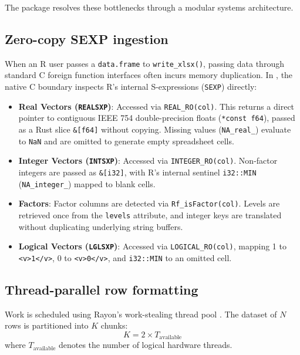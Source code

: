 The  package resolves these bottlenecks through a modular systems architecture.

\subsection{Zero-copy SEXP ingestion}\label{zero-copy-sexp-ingestion}

When an R user passes a \texttt{data.frame} to \texttt{write\_xlsx()}, passing data through standard C foreign function interfaces often incurs memory duplication. In , the native C boundary inspects R's internal S-expressions (\texttt{SEXP}) directly:

\begin{itemize}
\tightlist
\item
  \textbf{Real Vectors (\texttt{REALSXP})}: Accessed via \texttt{REAL\_RO(col)}. This returns a direct pointer to contiguous IEEE 754 double-precision floats (\texttt{*const\ f64}), passed as a Rust slice \texttt{\&{[}f64{]}} without copying. Missing values (\texttt{NA\_real\_}) evaluate to \texttt{NaN} and are omitted to generate empty spreadsheet cells.
\item
  \textbf{Integer Vectors (\texttt{INTSXP})}: Accessed via \texttt{INTEGER\_RO(col)}. Non-factor integers are passed as \texttt{\&{[}i32{]}}, with R's internal sentinel \texttt{i32::MIN} (\texttt{NA\_integer\_}) mapped to blank cells.
\item
  \textbf{Factors}: Factor columns are detected via \texttt{Rf\_isFactor(col)}. Levels are retrieved once from the \texttt{levels} attribute, and integer keys are translated without duplicating underlying string buffers.
\item
  \textbf{Logical Vectors (\texttt{LGLSXP})}: Accessed via \texttt{LOGICAL\_RO(col)}, mapping 1 to \texttt{\textless{}v\textgreater{}1\textless{}/v\textgreater{}}, 0 to \texttt{\textless{}v\textgreater{}0\textless{}/v\textgreater{}}, and \texttt{i32::MIN} to an omitted cell.
\end{itemize}

\subsection{Thread-parallel row formatting}\label{thread-parallel-row-formatting}

Work is scheduled using Rayon's work-stealing thread pool \citep{matsakis2014rust}. The dataset of \(N\) rows is partitioned into \(K\) chunks:
\[K = 2 \times T_{\text{available}}\]
where \(T_{\text{available}}\) denotes the number of logical hardware threads.

